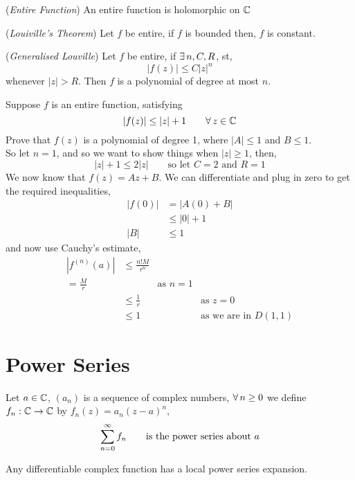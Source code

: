 \documentclass{article}
\begin{document}
\begin{ndefi}{(\textit{Entire Function})}
  An entire function is holomorphic on $\mathbb{C}$
\end{ndefi}

\begin{nthm}{(\textit{Louiville's Theorem})}
  Let $f$ be entire, if $f$ is bounded then, $f$ is constant.
\end{nthm}

\begin{nthm}{(\textit{Generalised Louville})}
  Let $f$ be entire, if $\exists\, n, C, R$, st,
  $$ |f(z)| \le C|z|^n $$
  whenever $|z| > R$. Then $f$ is a polynomial of degree at most $n$.
\end{nthm}

\begin{eg}
  Suppose $f$ is an entire function, satisfying
  $$ |f(z)| \le |z| + 1 \qquad \forall\, z \in \mathbb{C} $$
  Prove that $f(z)$ is a polynomial of degree 1, where $|A| \le 1$ and $B \le 1$.\\
  So let $n = 1$, and so we want to show things when $|z| \ge 1$, then,
  $$ |z| + 1 \le 2|z| \qquad \text{so let $C = 2$ and $R=1$}$$
  We now know that $f(z) = Az + B$. We can differentiate and plug in zero to get the required inequalities,
  \begin{align*}
    |f(0)| &= |A(0) + B|\\
    &\le |0| + 1\\
    |B| &\le 1
  \end{align*}
  and now use Cauchy's estimate,
  \begin{align*}
    |f^{(n)}(a)| &\le \frac{n!M}{r^n}\\
    = \frac{M}{r} && \text{as $n=1$}\\
    &\le \frac{1}{r} && \text{as $z = 0$}\\
    &\le 1 && \text{as we are in $D(1, 1)$}
  \end{align*}
\end{eg}

\section{Power Series}
Let $a\in\mathbb{C}$, $(a_n)$ is a sequence of complex numbers, $\forall\, n\ge 0$ we define $f_n: \mathbb{C}\to\mathbb{C}$ by $f_n(z) = a_n(z-a)^n$,
$$ \sum_{n=0}^\infty f_n \qquad \text{is the power series about $a$} $$
\begin{nlemma}
  Any differentiable complex function has a local power series expansion.
\end{nlemma}
\end{document}
